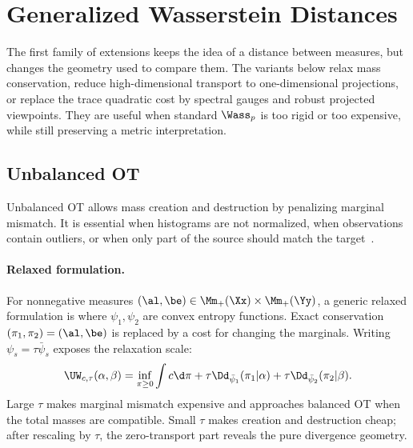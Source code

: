 
\section{Generalized Wasserstein Distances}
\label{sec-extensions}
\label{sec-generalized-wasserstein-distances}

The first family of extensions keeps the idea of a distance between measures, but changes the geometry used to compare them. The variants below relax mass conservation, reduce high-dimensional transport to one-dimensional projections, or replace the trace quadratic cost by spectral gauges and robust projected viewpoints. They are useful when standard $\Wass_p$ is too rigid or too expensive, while still preserving a metric interpretation.

\subsection{Unbalanced OT}
\label{sec-unbalanced}

Unbalanced OT allows mass creation and destruction by penalizing marginal mismatch. It is essential when histograms are not normalized, when observations contain outliers, or when only part of the source should match the target~\cite{LieroMielkeSavareLong,2015-chizat-unbalanced,2017-chizat-focm}.

\paragraph{Relaxed formulation.}

For nonnegative measures $(\al,\be) \in \Mm_+(\Xx) \times \Mm_+(\Yy)$, a generic relaxed formulation is
where $\psi_1,\psi_2$ are convex entropy functions. Exact conservation $(\pi_1,\pi_2)=(\al,\be)$ is replaced by a cost for changing the marginals. Writing $\psi_s=\tau\bar\psi_s$ exposes the relaxation scale:
\[
	\UW_{c,\tau}(\alpha,\beta)
	=
	\inf_{\pi\geq0}
	\int c\d\pi
	+
	\tau\Dd_{\bar\psi_1}(\pi_1|\alpha)
	+
	\tau\Dd_{\bar\psi_2}(\pi_2|\beta).
\]
Large $\tau$ makes marginal mismatch expensive and approaches balanced OT when the total masses are compatible. Small $\tau$ makes creation and destruction cheap; after rescaling by $\tau$, the zero-transport part reveals the pure divergence geometry.

